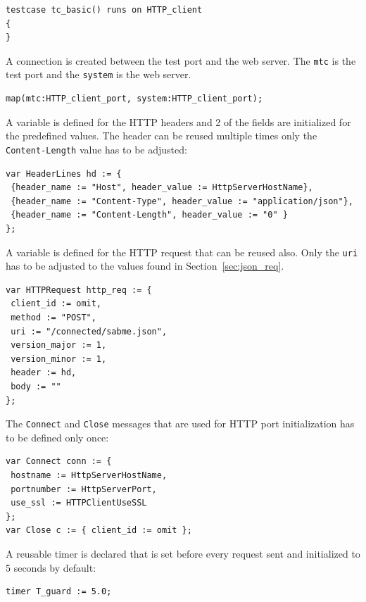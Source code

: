 \documentclass[a4paper]{article}
\begin{document}
{\footnotesize
\begin{lstlisting}
testcase tc_basic() runs on HTTP_client
{
}
\end{lstlisting}
}

A connection is created between the test port and the web server. The \verb!mtc! is the test port and the \verb!system! is the web server.

{\footnotesize
\begin{lstlisting}
map(mtc:HTTP_client_port, system:HTTP_client_port);
\end{lstlisting}
}

A variable is defined for the HTTP headers and 2 of the fields are initialized for the predefined values. The header can be reused multiple times only the \verb!Content-Length! value has to be adjusted:

{\footnotesize
\begin{lstlisting}
var HeaderLines hd := { 
 {header_name := "Host", header_value := HttpServerHostName},
 {header_name := "Content-Type", header_value := "application/json"},
 {header_name := "Content-Length", header_value := "0" }
};
\end{lstlisting}
}

A variable is defined for the HTTP request that can be reused also. Only the \verb!uri! has to be adjusted to the values found in Section~\ref{sec:json_req}.

{\footnotesize
\begin{lstlisting}
var HTTPRequest http_req := { 
 client_id := omit, 
 method := "POST", 
 uri := "/connected/sabme.json", 
 version_major := 1, 
 version_minor := 1, 
 header := hd, 
 body := ""
};
\end{lstlisting}
}

The \verb!Connect! and \verb!Close! messages that are used for HTTP port initialization has to be defined only once:

{\footnotesize
\begin{lstlisting}
var Connect conn := { 
 hostname := HttpServerHostName,
 portnumber := HttpServerPort, 
 use_ssl := HTTPClientUseSSL
};
var Close c := { client_id := omit };
\end{lstlisting}
}

A reusable timer is declared that is set before every request sent and initialized to 5 seconds by default:

{\footnotesize
\begin{lstlisting}
timer T_guard := 5.0;
\end{lstlisting}
}
\end{document}
